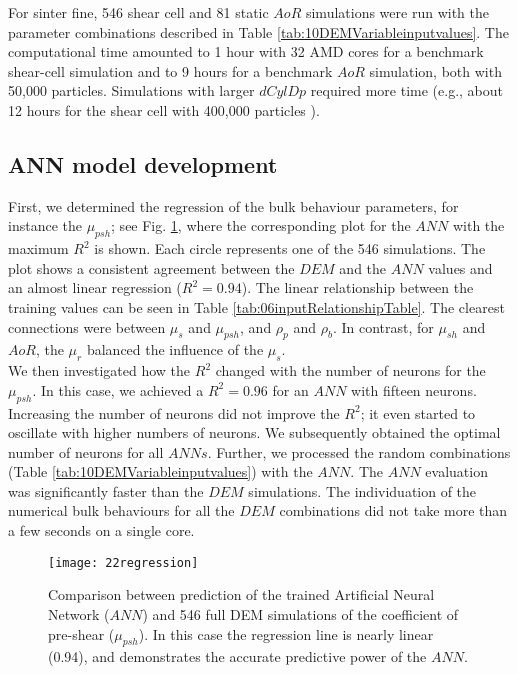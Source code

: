 \documentclass{llncs}
\begin{document}
For sinter fine, 546 shear cell and 81 static $AoR$ simulations were run with
the parameter combinations described in Table
\ref{tab:10DEMVariableinputvalues}.
The computational time amounted to 1 hour with 32 AMD cores for a benchmark
shear-cell simulation and to 9 hours for a benchmark $AoR$ simulation, both with
50,000 particles.
Simulations with larger $dCylDp$ required more time (e.g., about 12 hours for
the shear cell with 400,000 particles ). \\


\subsection{ANN model development}
\label{subsec:annmodeldev}

First, we determined the regression of the bulk behaviour parameters, for
instance the $\mu_{psh}$; see Fig. \ref{fig:22regression}, where the
corresponding plot for the $ANN$ with the maximum $R^2$ is shown. Each circle represents one of the 546
simulations.
The plot shows a consistent agreement between the 
$DEM$ and the $ANN$ values and an almost linear regression ($R^2
= 0.94$).
The linear relationship between the
training values can be seen in Table \ref{tab:06inputRelationshipTable}.
The clearest connections were between $\mu_s$ and $\mu_{psh}$, and
$\rho_p$ and $\rho_b$.
In contrast, for $\mu_{sh}$ and $AoR$, the $\mu_r$ balanced the influence of the 
$\mu_s$. \\
We then investigated how the $R^2$ changed with the number of neurons
for the $\mu_{psh}$.
In this case, we achieved a $R^2 = 0.96$ for an $ANN$ with fifteen neurons. 
Increasing the number of neurons did not improve the $R^2$; it even started to
oscillate with higher numbers of neurons.
We subsequently obtained the optimal number of neurons for all $ANNs$.
Further, we processed the random combinations (Table
\ref{tab:10DEMVariableinputvalues}) with the $ANN$.
The $ANN$ evaluation was significantly faster than the $DEM$ simulations. The
individuation of the numerical bulk behaviours for all the $DEM$ combinations
did not take more than a few seconds on a single core.
\begin{figure}[!h] 
\centering 
\texttt{[image: 22regression]}
\caption[Comparison between prediction of the trained ANN and full DEM
simulation]{Comparison between prediction of the trained Artificial Neural
Network ($ANN$) and 546 full DEM simulations of the coefficient of pre-shear
($\mu_{psh}$). In this case the regression line is nearly linear (0.94), and
demonstrates the accurate predictive power of the $ANN$.}
\label{fig:22regression} 
\end{figure}
\end{document}
